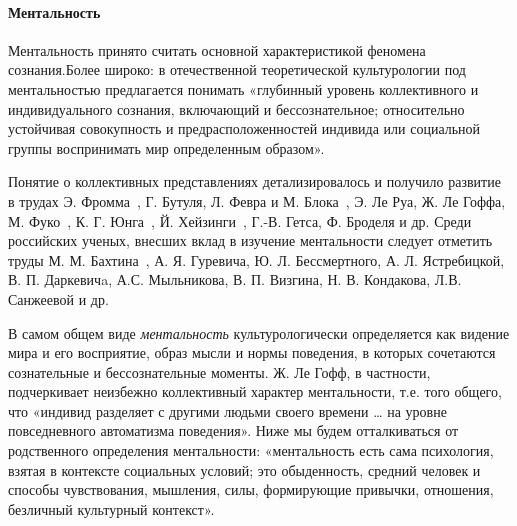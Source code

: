 \paragraph{Ментальность}
\label{mentality}
Ментальность принято считать основной характеристикой феномена сознания.\autocite[][52]{edoshina2000}Более широко: в отечественной теоретической культурологии под ментальностью предлагается понимать «глубинный уровень коллективного и индивидуального сознания, включающий и бессознательное; относительно устойчивая совокупность и предрасположенностей индивида или социальной группы воспринимать мир определенным образом».\autocite[][414]{razlogov2005}

Понятие о коллективных представлениях детализировалось и получило развитие в трудах Э. Фромма~\autocite{book:davydov}, Г. Бутуля,
Л. Февра и М. Блока~\autocite{book:febvre}, Э. Ле Руа, Ж. Ле Гоффа,
М. Фуко~\autocite{book:arch}, К. Г. Юнга~\autocite{book:yung},
Й. Хейзинги~\autocite{book:heizenga}, Г.-В. Гетса, Ф. Броделя  и др. Среди российских ученых, внесших вклад в изучение ментальности следует отметить труды М. М. Бахтина~\autocite{book:tamarchenko}, А. Я. Гуревича, Ю. Л. Бессмертного, А. Л. Ястребицкой, В. П. Даркевичa\autocite{levit1998}, А.С. Мыльникова\autocite{milnikov1996}, В. П. Визгина, Н. В. Кондакова, Л.В. Санжеевой\autocite{sanjeeva2011} и др.

В самом общем виде \emph{ментальность} культурологически определяется как
видение мира и его восприятие, образ мысли и нормы поведения, в которых сочетаются
сознательные и бессознательные моменты. Ж. Ле Гофф, в частности, подчеркивает неизбежно коллективный характер ментальности, т.е. того общего, что «индивид разделяет с другими людьми своего времени … на уровне повседневного автоматизма поведения»\autocite{sharte2004}. Ниже мы будем отталкиваться от родственного определения ментальности: «ментальность есть сама психология, взятая в контексте социальных условий; это обыденность, средний человек и способы чувствования, мышления, силы, формирующие привычки, отношения, безличный культурный контекст».\autocite{online:kulturolog} 

